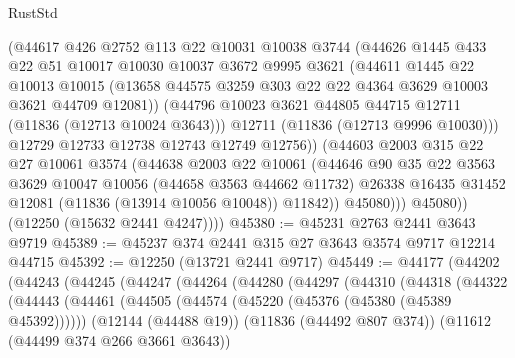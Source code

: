 \begin{lexlean}{RustStd}
\begin{coremodule}
                  (@44617
                    @426
                    @2752
                    @113
                    @22
                    @10031
                    @10038
                    @3744
                    (@44626
                      @1445
                      @433
                      @22
                      @51
                      @10017
                      @10030
                      @10037
                      @3672
                      @9995
                      @3621
                      (@44611
                        @1445
                        @22
                        @10013
                        @10015
                        (@13658 @44575 @3259 @303 @22 @22 @4364 @3629 @10003 @3621 @44709 @12081))
                      (@44796 @10023 @3621 @44805 @44715 @12711 (@11836 (@12713 @10024 @3643)))
                      @12711
                      (@11836 (@12713 @9996 @10030)))
                    @12729
                    @12733
                    @12738
                    @12743
                    @12749
                    @12756))
                (@44603
                  @2003
                  @315
                  @22
                  @27
                  @10061
                  @3574
                  (@44638
                    @2003
                    @22
                    @10061
                    (@44646
                      @90
                      @35
                      @22
                      @3563
                      @3629
                      @10047
                      @10056
                      (@44658 @3563 @44662 @11732)
                      @26338
                      @16435
                      @31452
                      @12081
                      (@11836 (@13914 @10056 @10048))
                      @11842))
                  @45080)))
            @45080))
        (@12250 (@15632 @2441 @4247))))
@45380 := @45231 @2763 @2441 @3643 @9719
@45389 := @45237 @374 @2441 @315 @27 @3643 @3574 @9717 @12214 @44715
@45392 := @12250 (@13721 @2441 @9717)
@45449 := @44177
    (@44202
      (@44243
        (@44245
          (@44247
            (@44264
              (@44280
                (@44297
                  (@44310
                    (@44318
                      (@44322
                        (@44443
                          (@44461
                            (@44505 (@44574 (@45220 (@45376 (@45380 (@45389 @45392))))))
                            (@12144 (@44488 @19))
                            (@11836 (@44492 @807 @374))
                            (@11612 (@44499 @374 @266 @3661 @3643))

\end{coremodule}
\end{lexlean}
